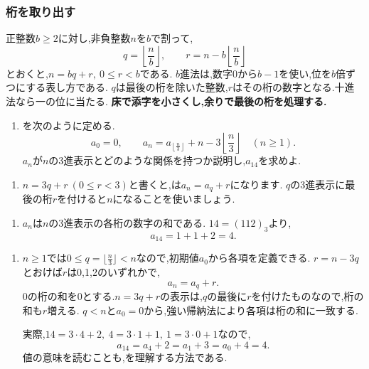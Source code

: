 \subsubsection{桁を取り出す}\label{節：桁を取り出す}
正整数$b\ge2$に対し,非負整数$n$を$b$で割って,
\[
  q=\left\lfloor\frac nb\right\rfloor,
  \qquad r=n-b\left\lfloor\frac nb\right\rfloor
\]
とおくと,$n=bq+r,\ 0\le r<b$である.
$b$進法は,数字0から$b-1$を使い,位を$b$倍ずつにする表し方である.
$q$は最後の桁を除いた整数,$r$はその桁の数字となる.十進法なら一の位に当たる.
\textbf{床で添字を小さくし,余りで最後の桁を処理する.}

\noindent {}\par\nobreak
\begin{enumerate}[label=(\arabic*),parsep=3pt,beginpenalty=10000,format=\bookitemlink{example-gauss-role-8}{problem}{answer}]
  \item {}を次のように定める.
    \[
      a_0=0,\qquad
      a_n=a_{\left\lfloor\frac n3\right\rfloor}
      +n-3\left\lfloor\frac n3\right\rfloor
      \quad(n\ge1).
    \]
    $a_n$が$n$の3進表示とどのような関係を持つか説明し,$a_{14}$を求めよ.
\end{enumerate}

\noindent {}\par\nobreak
\begin{enumerate}[label=(\arabic*),parsep=3pt,beginpenalty=10000,format=\bookitemlink{example-gauss-role-8}{hint}{problem}]
  \item $n=3q+r\ (0\le r<3)$と書くと,は$a_n=a_q+r$になります.
    $q$の3進表示に最後の桁$r$を付けると$n$になることを使いましょう.
\end{enumerate}

\noindent {}\par\nobreak
\begin{enumerate}[label=(\arabic*),parsep=3pt,beginpenalty=10000,format=\bookitemlink{example-gauss-role-8}{answer}{problem}]
  \item $a_n$は$n$の3進表示の各桁の数字の和である.
    $14=(112)_3$より,
    \[
      a_{14}=1+1+2=4.
    \]
\end{enumerate}

\noindent {}\par\nobreak
\begin{enumerate}[label=(\arabic*),parsep=3pt,beginpenalty=10000,format=\bookitemlink{example-gauss-role-8}{solution}{problem}]
  \item $n\ge1$では$0\le q=\lfloor\frac n3\rfloor<n$なので,初期値$a_0$から各項を定義できる.
    $r=n-3q$とおけば$r$は0,1,2のいずれかで,
    \[
      a_n=a_q+r.
    \]
    0の桁の和を0とする.$n=3q+r$の表示は,$q$の最後に$r$を付けたものなので,桁の和も$r$増える.
    $q<n$と$a_0=0$から,強い帰納法により各項は桁の和に一致する.

    実際,$14=3\cdot4+2,\ 4=3\cdot1+1,\ 1=3\cdot0+1$なので,
    \[
      a_{14}=a_4+2=a_1+3=a_0+4=4.
    \]
    値の意味を読むことも,を理解する方法である.
\end{enumerate}
